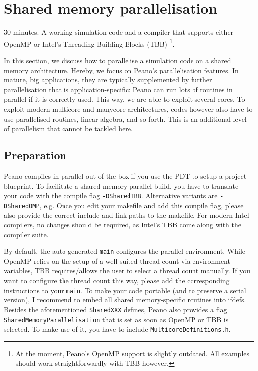 \section{Shared memory parallelisation}
  \label{section:parallelisation:shared-memory}


\chapterDescription
  {
    30 minutes.
  }
  {
    A working simulation code and a compiler that supports either OpenMP or
    Intel's Threading Building Blocks (TBB) \footnote{At the moment, Peano's
    OpenMP support is slightly outdated. All examples should work straightforwardly
    with TBB however.}.
  }

In this section, we discuss how to parallelise a simulation code on a shared
memory architecture.
Hereby, we focus on Peano's parallelisation features. 
In mature, big applications, they are typically supplemented by further
parallelisation that is application-specific: Peano can run lots of routines in
parallel if it is correctly used. 
This way, we are able to exploit several cores.
To exploit modern multicore and manycore architectures, codes however also have
to use parallelised routines, linear algebra, and so forth.
This is an additional level of parallelism that cannot be tackled here.

\subsection{Preparation}
\label{section:shared-memory:preparation}

Peano compiles in parallel out-of-the-box if you use the PDT to setup a project
blueprint. 
To facilitate a shared memory parallel build, you have to translate your code
with the compile flag \texttt{-DSharedTBB}. 
Alternative variants are \texttt{-DSharedOMP}, e.g.
Once you edit your makefile and add this compile flag, please also provide the
correct include and link paths to the makefile.
For modern Intel compilers, no changes should be required, as Intel's TBB come
along with the compiler suite.

By default, the auto-generated \texttt{main} configures the parallel environment. 
While OpenMP relies on the setup of a well-suited thread count via environment
variables, TBB requires/allows the user to select a thread count manually. 
If you want to configure the thread count this way, please add the corresponding
instructions to your \texttt{main}.
To make your code portable (and to preserve a serial version), I recommend to
embed all shared memory-specific routines into ifdefs.
Besides the aforementioned \texttt{SharedXXX} defines, Peano also provides a
flag \texttt{SharedMemoryParallelisation} that is set as soon as OpenMP or TBB
is selected.
To make use of it, you have to include
\linebreak \texttt{MulticoreDefinitions.h}.

